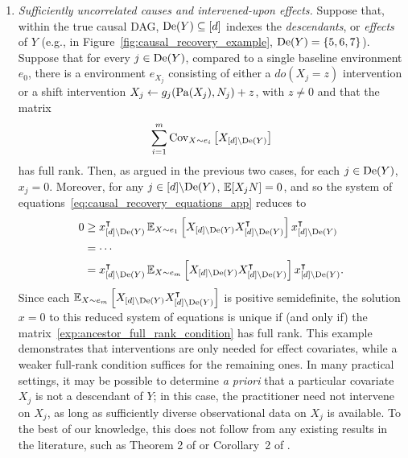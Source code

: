 \documentclass{article}
\begin{document}
\begin{enumerate}[itemsep=1em]
    \item \textit{Sufficiently uncorrelated causes and intervened-upon effects.} Suppose that, within the true causal DAG, $\mathrm{De}(Y) \subseteq [d]$ indexes the \emph{descendants}, or \emph{effects} of $Y$ (e.g., in Figure~\ref{fig:causal_recovery_example}, $\mathrm{De}(Y) = \{5,6,7\}$). Suppose that for every $j \in \mathrm{De}(Y)$, compared to a single baseline environment $e_0$, there is a environment $e_{X_j}$ consisting of either a $do(X_j = z)$ intervention or a shift intervention $X_j \leftarrow g_j(\mathrm{Pa}(X_j), N_j) + z$, with $z \neq 0$ and that the matrix
    \begin{equation}
        \sum_{i = 1}^m \operatorname{Cov}_{X \sim e_i} \left[ X_{[d]\backslash \mathrm{De}(Y)} \right]
        \label{exp:ancestor_full_rank_condition}
    \end{equation}
    has full rank. Then, as argued in the previous two cases, for each $j \in \mathrm{De}(Y)$, $x_j = 0$. Moreover, for any $j \in [d] \backslash \mathrm{De}(Y)$, $\operatorname{\mathbb{E}}[X_j N] = 0$, and so the system of equations~\eqref{eq:causal_recovery_equations_app} reduces to
    \begin{align*}
        0
        & \geq x_{[d]\backslash \mathrm{De}(Y)}^\intercal \operatorname{\mathbb{E}}_{X \sim e_1} \left[ X_{[d]\backslash \mathrm{De}(Y)} X_{[d]\backslash \mathrm{De}(Y)}^\intercal \right] x_{[d]\backslash \mathrm{De}(Y)}^\intercal \\
        & = \cdots \\
        & = x_{[d]\backslash \mathrm{De}(Y)}^\intercal \operatorname{\mathbb{E}}_{X \sim e_m} \left[ X_{[d]\backslash \mathrm{De}(Y)} X_{[d]\backslash \mathrm{De}(Y)}^\intercal \right] x_{[d]\backslash \mathrm{De}(Y)}^\intercal.
    \end{align*}
    Since each $\operatorname{\mathbb{E}}_{X \sim e_m} \left[ X_{[d]\backslash \mathrm{De}(Y)} X_{[d]\backslash \mathrm{De}(Y)}^\intercal \right]$ is positive semidefinite, the solution $x = 0$ to this reduced system of equations is unique if (and only if) the matrix~\eqref{exp:ancestor_full_rank_condition} has full rank.
    This example demonstrates that interventions are only needed for effect covariates, while a weaker full-rank condition suffices for the remaining ones. In many practical settings, it may be possible to determine \textit{a priori} that a particular covariate $X_j$ is not a descendant of $Y$; in this case, the practitioner need not intervene on $X_j$, as long as sufficiently diverse observational data on $X_j$ is available.
    To the best of our knowledge, this does not follow from any existing results in the literature, such as Theorem 2 of \citet{peters2016causal} or Corollary~2 of \cite{yin2021optimization}. 
    
\end{enumerate}
%
%
%
%
%
\end{document}
